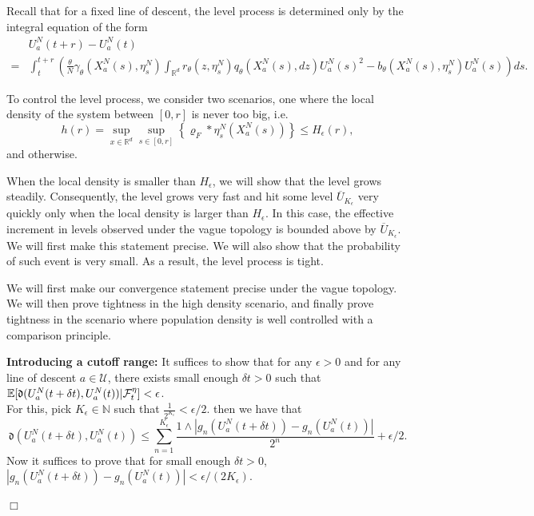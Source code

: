\documentclass[12pt]{article}
\newenvironment {proof}{{\noindent\bf Proof }}{\hfill $\Box$ \medskip}
\newcommand{\IR}{\mathbb R}
\begin{document}
\begin{proof} Recall that for a fixed line of descent, the level process is determined only by the integral equation of the form 
\begin{align*}
&U^{N}_{a}(t+r)-U^{N}_{a}(t)\\
=&\int_{t}^{t+r}
\left(
        \frac{\theta}{N} \gamma_{\theta}(X^N_{a}(s),\eta^N_s)
        \int_{\IR^d} r_{\theta}(z,\eta^N_s) q_{\theta}(X^N_a(s),dz) U^N_a(s)^2
        -
        b_{\theta}(X^N_a(s),\eta^N_s) U^N_a(s)
    \right)
    ds.
\end{align*}

To control the level process, we consider two scenarios, one where the local density of the system between $[0,r]$ is never too big, i.e.
$$h(r)=\sup_{x \in \IR^d}\sup_{s\in [0,r]}\left\{\varrho_F*\eta^N_s(X^N_a(s)) \right\} \leq H_{\epsilon}(r),$$
and otherwise. 

When the local density is smaller than $H_{\epsilon}$, we will show that the level grows steadily. Consequently, the level grows very fast and hit some level $\overline{U}_{K_{\epsilon}}$ very quickly only when the local density is larger than $H_{\epsilon}$. In this case, the effective increment in levels observed under the vague topology is bounded above by $\overline{U}_{K_{\epsilon}}$. We will first make this statement precise. 
We will also show that the probability of such event is very small.
As a result, the level process is tight.

We will first make our convergence statement precise under the vague topology. 
We will then prove tightness in the high density scenario,
and finally
prove tightness in the scenario where population density is well controlled
with a comparison principle.  

\textbf{Introducing a cutoff range:} It suffices to show that for any $\epsilon > 0$ and for any line of descent $a \in \mathcal{U}$, there exists small enough  $\delta t>0$ such that $\mathbb{E}[\mathfrak{d}(U^{N}_{a}(t+\delta t),U^{N}_{a}(t))|{\cal F}_t^{
\eta}]< \epsilon$. \\
For this, pick $K_{\epsilon} \in \mathbb{N}$ such that $\frac{1}{2^{K_{\epsilon}}} < \epsilon/2$. then we have that 
\begin{equation}
\mathfrak{d}(U^{N}_{a}(t+\delta t),U^{N}_{a}(t))\leq  \sum_{n=1}^{K_{\epsilon}}\frac{1 \wedge |g_n(U^{N}_{a}(t+\delta t))-g_n(U^{N}_{a}(t))|}{2^n} +  \epsilon/2. 
\end{equation}
Now it suffices to prove that for small enough $\delta t>0$, $|g_n(U^{N}_{a}(t+\delta t))-g_n(U^{N}_{a}(t))| < \epsilon / (2K_{\epsilon})$. 


\end{proof}
\end{document}
